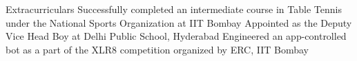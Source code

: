 
\begin{rubric}{Extracurriculars}
	\entry*[2019] Successfully completed an intermediate course in Table Tennis under the National Sports Organization at IIT Bombay
	\entry*[2016] Appointed as the Deputy Vice Head Boy at Delhi Public School, Hyderabad
	\entry*[2019\phantom{}] Engineered an app-controlled bot as a part of the XLR8 competition organized by ERC, IIT Bombay
\end{rubric}